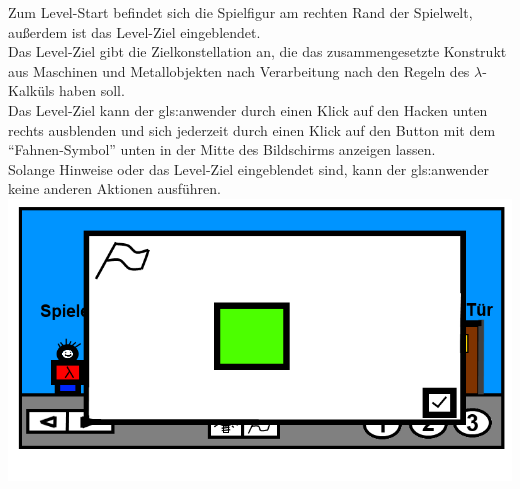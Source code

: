 \documentclass{scrartcl}
\begin{document}
\begin{description}
	\begin{enumerate}
		\begin{minipage}{1\textwidth}
			\item \label{Levelaufbau:Levelstart	} Zum Level-Start befindet sich die Spielfigur am rechten Rand der Spielwelt,\\
			außerdem ist das Level-Ziel eingeblendet.\\
			Das Level-Ziel gibt die Zielkonstellation an, die das zusammengesetzte Konstrukt aus Maschinen und Metallobjekten nach Verarbeitung nach den Regeln des $\lambda$-Kalküls haben soll.\\
			Das Level-Ziel kann der \gls{gls:anwender} durch einen Klick auf den Hacken unten rechts ausblenden und sich jederzeit durch einen Klick auf den Button mit dem ``Fahnen-Symbol'' unten in der Mitte des Bildschirms anzeigen lassen.\\ Solange Hinweise oder das Level-Ziel eingeblendet sind, kann der \gls{gls:anwender} keine anderen Aktionen ausführen.\\
			\includegraphics[scale=0.5]{assets/Levelziel}
		\end{minipage}
		

\end{enumerate}
\end{description}
\end{document}
